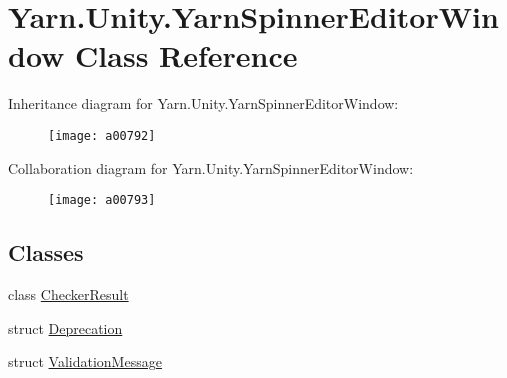 \hypertarget{a00186}{\section{Yarn.\-Unity.\-Yarn\-Spinner\-Editor\-Window Class Reference}
\label{a00186}
}


Inheritance diagram for Yarn.\-Unity.\-Yarn\-Spinner\-Editor\-Window\-:
\nopagebreak
\begin{figure}[H]
\begin{center}
\leavevmode
\texttt{[image: a00792]}
\end{center}
\end{figure}


Collaboration diagram for Yarn.\-Unity.\-Yarn\-Spinner\-Editor\-Window\-:
\nopagebreak
\begin{figure}[H]
\begin{center}
\leavevmode
\texttt{[image: a00793]}
\end{center}
\end{figure}
\subsection*{Classes}
\begin{DoxyCompactItemize}
\item 
class \hyperlink{a00049}{Checker\-Result}
\item 
struct \hyperlink{a00090}{Deprecation}
\item 
struct \hyperlink{a00186_a00383}{Validation\-Message}
\end{DoxyCompactItemize}
